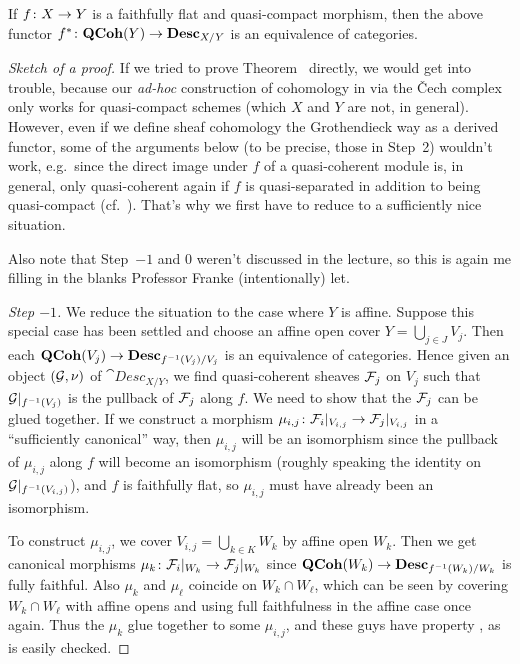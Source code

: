 \documentclass[a4paper,parskip=half,numbers=enddot, DIV=12]{scrreprt}
\begin{document}
\begin{thm}
	If $f\colon X\morphism Y$ is a faithfully flat and quasi-compact morphism, then the above functor $f^*\colon\cat{QCoh}(Y)\morphism\cat{Desc}_{X/Y}$ is an equivalence of categories.
\end{thm}
\begin{proof}[Sketch of a proof]
	If we tried to prove Theorem~ directly, we would get into trouble, because our \emph{ad-hoc} construction of cohomology in \cite[Section~1.2]{alggeo2} via the \v Cech complex only works for quasi-compact schemes (which $X$ and $Y$ are not, in general). However, even if we define sheaf cohomology the Grothendieck way as a derived functor, some of the arguments below (to be precise, those in Step~2) wouldn't work, e.g.\ since the direct image under $f$ of a quasi-coherent module is, in general, only quasi-coherent again if $f$ is quasi-separated in addition to being quasi-compact (cf.\ \cite[Proposition~1.5.2]{alggeo1}). That's why we first have to reduce to a sufficiently nice situation.
	
	Also note that Step~$-1$ and 0 weren't discussed in the lecture, so this is again me filling in the blanks Professor Franke (intentionally) let.
	
	\emph{Step $-\text{1}$.} We reduce the situation to the case where $Y$ is affine. Suppose this special case has been settled and choose an affine open cover $Y=\bigcup_{j\in J}V_j$. Then each $\cat{QCoh}(V_j)\morphism\cat{Desc}_{f^{-1}(V_j)/V_j}$ is an equivalence of categories. Hence given an object $(\mathcal{G},\nu)$ of $\cat{Desc}_{X/Y}$, we find quasi-coherent sheaves $\mathcal{F}_j$ on $V_j$ such that $\mathcal{G}|_{f^{-1}(V_j)}$ is the pullback of $\mathcal{F}_j$ along $f$. We need to show that the $\mathcal{F}_j$ can be glued together. If we construct a morphism $\mu_{i,j}\colon \Ff_i|_{V_{i,j}}\morphism\Ff_j|_{V_{i,j}}$ in a ``sufficiently canonical'' way, then $\mu_{i,j}$ will be an isomorphism since the pullback of $\mu_{i,j}$ along $f$ will become an isomorphism (roughly speaking the identity on $\mathcal{G}|_{f^{-1}(V_{i,j})}$), and $f$ is faithfully flat, so $\mu_{i,j}$ must have already been an isomorphism.
	
	To construct $\mu_{i,j}$, we cover $V_{i,j}=\bigcup_{k\in K}W_k$ by affine open $W_k$. Then we get canonical morphisms $\mu_k\colon \Ff_i|_{W_k}\morphism\Ff_j|_{W_k}$ since $\cat{QCoh}(W_k)\morphism\cat{Desc}_{f^{-1}(W_k)/W_k}$ is fully faithful. Also $\mu_k$ and $\mu_\ell$ coincide on $W_k\cap W_\ell$, which can be seen by covering $W_k\cap W_\ell$ with affine opens and using full faithfulness in the affine case once again. Thus the $\mu_k$ glue together to some $\mu_{i,j}$, and these guys have property , as is easily checked.
	

\end{proof}
\end{document}
